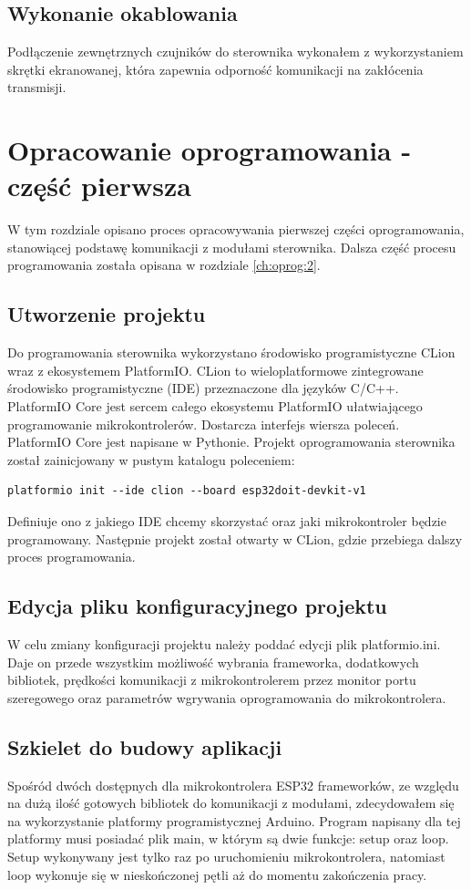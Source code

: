 \documentclass[11pt]{report}
\begin{document}
 
 \section{Wykonanie okablowania}
 Podłączenie zewnętrznych czujników do sterownika wykonałem z wykorzystaniem skrętki ekranowanej, która zapewnia odporność komunikacji na zakłócenia transmisji.
 
 
 \chapter{Opracowanie oprogramowania - część pierwsza}\label{ch:oprog:1}
 W tym rozdziale opisano proces opracowywania pierwszej części oprogramowania, stanowiącej podstawę komunikacji z modułami sterownika. Dalsza część procesu programowania została opisana w rozdziale \ref{ch:oprog:2}.
 
 \section{Utworzenie projektu}
 Do programowania sterownika wykorzystano środowisko programistyczne CLion wraz z ekosystemem PlatformIO.
 CLion to wieloplatformowe zintegrowane środowisko programistyczne (IDE) przeznaczone dla języków C/C++.
 PlatformIO Core jest sercem całego ekosystemu PlatformIO ułatwiającego programowanie mikrokontrolerów. Dostarcza interfejs wiersza poleceń. PlatformIO Core jest napisane w Pythonie.
 Projekt oprogramowania sterownika został zainicjowany w pustym katalogu poleceniem:
 \begin{lstlisting}
platformio init --ide clion --board esp32doit-devkit-v1 
 \end{lstlisting}
 Definiuje ono z jakiego IDE chcemy skorzystać oraz jaki mikrokontroler będzie programowany.
 Następnie projekt został otwarty w CLion, gdzie przebiega dalszy proces programowania.
 
 \section{Edycja pliku konfiguracyjnego projektu}
 W celu zmiany konfiguracji projektu należy poddać edycji plik platformio.ini. Daje on przede wszystkim możliwość wybrania frameworka, dodatkowych bibliotek, prędkości komunikacji z mikrokontrolerem przez monitor portu szeregowego oraz parametrów wgrywania oprogramowania do mikrokontrolera.
 
 \section{Szkielet do budowy aplikacji}
 Spośród dwóch dostępnych dla mikrokontrolera ESP32 frameworków, ze względu na dużą ilość gotowych bibliotek do komunikacji z modułami, zdecydowałem się na wykorzystanie platformy programistycznej Arduino.
 Program napisany dla tej platformy musi posiadać plik main, w którym są dwie funkcje: setup oraz loop.
 Setup wykonywany jest tylko raz po uruchomieniu mikrokontrolera, natomiast loop wykonuje się w nieskończonej pętli aż do momentu zakończenia pracy.
 
\end{document}
